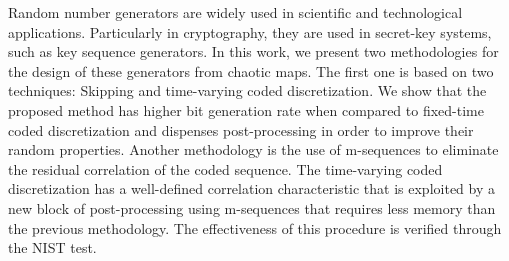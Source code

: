 Random number generators are widely used in scientific and technological applications. Particularly in cryptography, 
they are used in secret-key systems, such as key sequence generators. In this work, we present two methodologies 
for the design of these generators from chaotic maps. The first one is based on two techniques: Skipping and time-varying 
coded discretization. We show that the proposed method has higher bit generation rate when compared to fixed-time coded 
discretization and dispenses post-processing in order to improve their random properties. Another methodology is the use 
of m-sequences to eliminate the residual correlation of the coded sequence. The time-varying coded discretization has a 
well-defined correlation characteristic that is exploited by a new block of post-processing using m-sequences that 
requires less memory than the previous methodology. The effectiveness of this procedure is verified through the NIST 
test.

